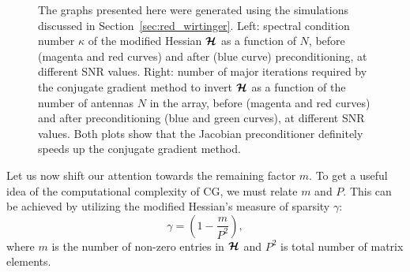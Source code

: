 \documentclass[useAMS,usenatbib]{mn2e}
\newcommand{\bmH}{\bmath{\mathcal{H}}}
\begin{document}
\begin{figure}
\centering
{}
\caption{The graphs presented here were generated using the simulations discussed in Section~\ref{sec:red_wirtinger}. Left: spectral condition number $\kappa$ of the modified Hessian $\bmH$ as a function of $N$, before (magenta and red curves) and after (blue curve) preconditioning, at different SNR values. Right: number of major iterations required by the conjugate 
gradient method to invert $\bmH$ as a function of the number of antennas $N$ in the array, before (magenta and red curves) and after preconditioning (blue and green curves), at different SNR values. Both plots show that the Jacobian preconditioner definitely speeds up the conjugate gradient method. \label{fig:kappa_itr}} 
\end{figure}


Let us now shift our attention towards the remaining factor $m$. To get a useful idea of the computational complexity of CG, we must relate $m$ and $P$. This can be achieved by utilizing the modified Hessian's measure of sparsity $\gamma$:   
\begin{equation}
 \gamma = \left (1 - \frac{m}{P^2} \right ),
\end{equation}
where $m$ is the number of non-zero entries in $\bmH$  and $P^2$ is total number of matrix elements. 
\end{document}

